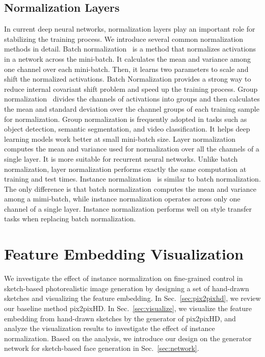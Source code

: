 \documentclass[10pt,twocolumn,letterpaper]{article}
\begin{document}
\subsection{Normalization Layers}
In current deep neural networks, normalization layers play an important role for stabilizing the training process. 
We introduce several common normalization methods in detail. 
Batch normalization~\cite{bn} is a method that normalizes activations in a network across the mini-batch. 
It calculates the mean and variance among one channel over each mini-batch. Then, it learns two parameters to scale and shift the normalized activations.
Batch Normalization provides a strong way to reduce internal covariant shift problem and speed up the training process.
Group normalization~\cite{gn} divides the channels of activations into groups and then calculates the mean and standard deviation over the channel groups of each training sample for normalization.
Group normalization is frequently adopted in tasks such as object detection, semantic segmentation, and video classification. It helps deep learning models work better at small mini-batch size.
Layer normalization~\cite{ln} computes the mean and variance used for normalization over all the channels of a single layer. It is more suitable for recurrent neural networks. 
Unlike batch normalization, layer normalization performs exactly the same computation at training and test times.
Instance normalization~\cite{instance_norm} is similar to batch normalization. The only difference is that batch normalization computes the mean and variance among a mimi-batch, while instance normalization operates across only one channel of a single layer. 
Instance normalization performs well on style transfer~\cite{carigan,apdrawinggan,stylization,cartoongan,singlegan,transgaga,harmonic} tasks when replacing batch normalization.


\section{Feature Embedding Visualization}
We investigate the effect of instance normalization on fine-grained control in sketch-based photorealistic image generation by designing a set of hand-drawn sketches and visualizing the feature embedding.
In Sec.~\ref{sec:pix2pixhd}, we review our baseline method pix2pixHD.
In Sec.~\ref{sec:visualize}, we visualize the feature embedding from hand-drawn sketches by the generator of pix2pixHD, and analyze the visualization results to investigate the effect of instance normalization. 
Based on the analysis, we introduce our design on the generator network for sketch-based face generation in Sec.~\ref{sec:network}.
\end{document}
